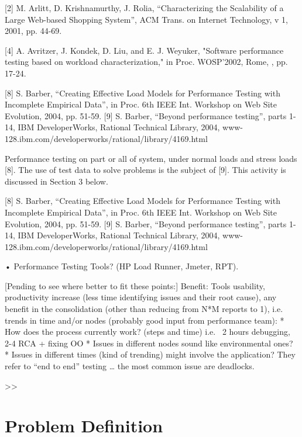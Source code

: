 \documentclass[runningheads,a4paper]{llncs}
\begin{document}
[2] M. Arlitt, D. Krishnamurthy, J. Rolia, “Characterizing
the Scalability of a Large Web-based Shopping System'',
ACM Trans. on Internet Technology, v 1, 2001, pp. 44-69.

[4] A. Avritzer, J. Kondek, D. Liu, and E. J. Weyuker,
"Software performance testing based on workload
characterization," in Proc. WOSP’2002, Rome, , pp. 17-24.

[8] S. Barber, “Creating Effective Load Models for
Performance Testing with Incomplete Empirical Data”, in
Proc. 6th IEEE Int. Workshop on Web Site Evolution, 2004,
pp. 51-59.
[9] S. Barber, “Beyond performance testing”, parts 1-14,
IBM DeveloperWorks, Rational Technical Library, 2004,
www-128.ibm.com/developerworks/rational/library/4169.html

Performance testing on part or all of system, under
normal loads and stress loads [8]. The use of test data
to solve problems is the subject of [9]. This activity is
discussed in Section 3 below.

[8] S. Barber, “Creating Effective Load Models for
Performance Testing with Incomplete Empirical Data”, in
Proc. 6th IEEE Int. Workshop on Web Site Evolution, 2004,
pp. 51-59.
[9] S. Barber, “Beyond performance testing”, parts 1-14,
IBM DeveloperWorks, Rational Technical Library, 2004,
www-128.ibm.com/developerworks/rational/library/4169.html


•	Performance Testing Tools? (HP Load Runner, Jmeter, RPT).

[Pending to see where better to fit these points:]
Benefit: Tools usability, productivity increase (less time identifying issues and their root cause), any benefit in the consolidation (other than reducing from N*M reports to 1), i.e. trends in time and/or nodes (probably good input from performance team):
* How does the process currently work? (steps and time) i.e. ~2 hours debugging, 2-4 RCA + fixing OO
* Issues in different nodes sound like environmental ones?
* Issues in different times (kind of trending) might involve the application?
They refer to “end to end” testing … the most common issue are deadlocks.

>>


\section{Problem Definition}
\end{document}
